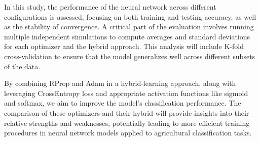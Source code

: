 In this study, the performance of the neural network across different configurations is assessed, focusing 
on both training and testing accuracy, as well as the stability of convergence. A critical part of the 
evaluation involves running multiple independent simulations to compute averages and standard deviations 
for each optimizer and the hybrid approach. This analysis will include K-fold cross-validation to ensure 
that the model generalizes well across different subsets of the data.

By combining RProp and Adam in a hybrid-learning approach, along with leveraging CrossEntropy loss and 
appropriate activation functions like sigmoid and softmax, we aim to improve the model’s classification 
performance. The comparison of these optimizers and their hybrid will provide insights into their relative 
strengths and weaknesses, potentially leading to more efficient training procedures in neural network models 
applied to agricultural classification tasks.



